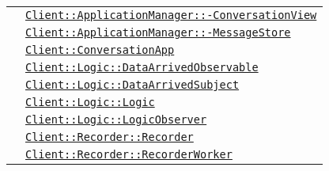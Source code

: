 \begin{longtable}{|>{\centering}m{3cm}|m{10cm}<{\centering}|}
& \hyperref[Client::ApplicationManager::ConversationView]{\texttt{Client::ApplicationManager::-\linebreak ConversationView}}\\
& \hyperref[Client::ApplicationManager::MessageStore]{\texttt{Client::ApplicationManager::-\linebreak MessageStore}}\\
& \hyperref[Client::ConversationApp]{\texttt{Client::ConversationApp}}\\
& \hyperref[Client::Logic::DataArrivedObservable]{\texttt{Client::Logic::DataArrivedObservable}}\\
& \hyperref[Client::Logic::DataArrivedSubject]{\texttt{Client::Logic::DataArrivedSubject}}\\
& \hyperref[Client::Logic::Logic]{\texttt{Client::Logic::Logic}}\\
& \hyperref[Client::Logic::LogicObserver]{\texttt{Client::Logic::LogicObserver}}\\
& \hyperref[Client::Recorder::Recorder]{\texttt{Client::Recorder::Recorder}}\\
& \hyperref[Client::Recorder::RecorderWorker]{\texttt{Client::Recorder::RecorderWorker}}\\ \hline


\end{longtable}

